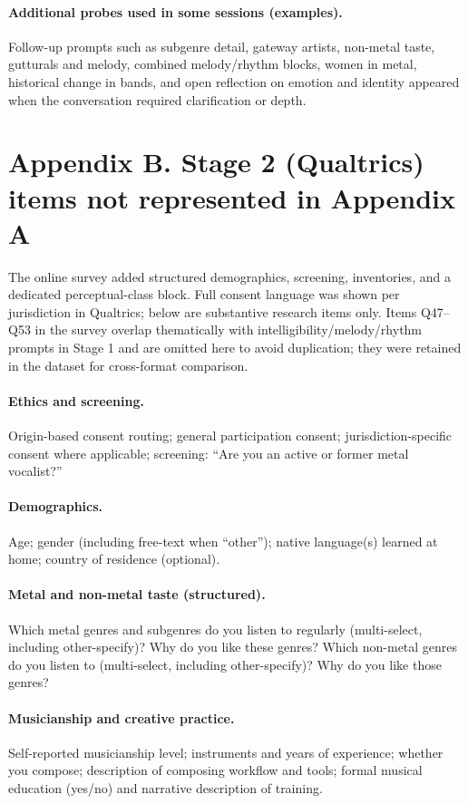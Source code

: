 \paragraph{Additional probes used in some sessions (examples).}
Follow-up prompts such as subgenre detail, gateway artists, non-metal taste, gutturals and melody, combined melody/rhythm blocks, women in metal, historical change in bands, and open reflection on emotion and identity appeared when the conversation required clarification or depth.

\section*{Appendix B. Stage 2 (Qualtrics) items not represented in Appendix A}
\label{app:stage2}

The online survey added structured demographics, screening, inventories, and a dedicated perceptual-class block. Full consent language was shown per jurisdiction in Qualtrics; below are substantive research items only. Items Q47--Q53 in the survey overlap thematically with intelligibility/melody/rhythm prompts in Stage 1 and are omitted here to avoid duplication; they were retained in the dataset for cross-format comparison.

\paragraph{Ethics and screening.}
Origin-based consent routing; general participation consent; jurisdiction-specific consent where applicable; screening: ``Are you an active or former metal vocalist?''

\paragraph{Demographics.}
Age; gender (including free-text when ``other''); native language(s) learned at home; country of residence (optional).

\paragraph{Metal and non-metal taste (structured).}
Which metal genres and subgenres do you listen to regularly (multi-select, including other-specify)? Why do you like these genres? Which non-metal genres do you listen to (multi-select, including other-specify)? Why do you like those genres?

\paragraph{Musicianship and creative practice.}
Self-reported musicianship level; instruments and years of experience; whether you compose; description of composing workflow and tools; formal musical education (yes/no) and narrative description of training.

